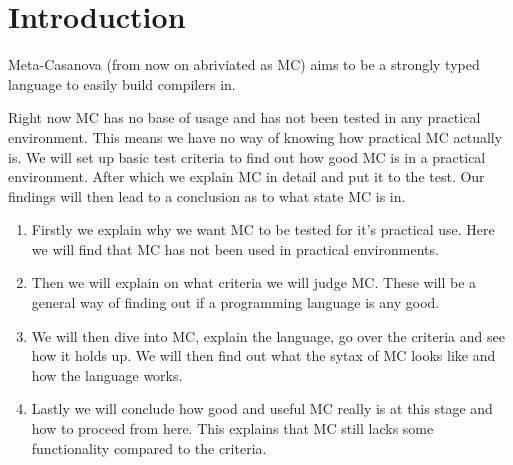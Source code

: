\section{Introduction}

Meta-Casanova (from now on abriviated as MC) aims to be a strongly typed language to easily build compilers in.

Right now MC has no base of usage and has not been tested in any practical environment.
This means we have no way of knowing how practical MC actually is.
We will set up basic test criteria to find out how good MC is in a practical environment.
After which we explain MC in detail and put it to the test.
Our findings will then lead to a conclusion as to what state MC is in.

\begin{enumerate}
	\item Firstly we explain why we want MC to be tested for it's practical use.
      Here we will find that MC has not been used in practical environments.
	\item Then we will explain on what criteria we will judge MC.
      These will be a general way of finding out if a programming language is any good.
	\item We will then dive into MC, explain the language, go over the criteria and see how it holds up.
      We will then find out what the sytax of MC looks like and how the language works.
	\item Lastly we will conclude how good and useful MC really is at this stage and how to proceed from here.
      This explains that MC still lacks some functionality compared to the criteria.

\end{enumerate}

